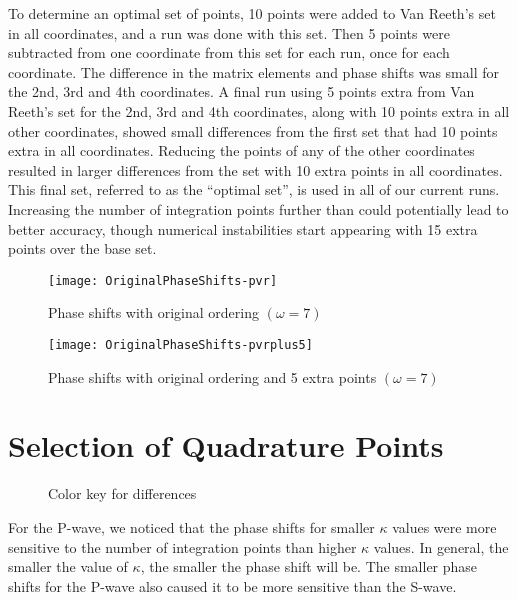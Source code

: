 \documentclass[Dissertation.tex]{subfiles}
\begin{document}
To determine an optimal set of points, 10 points were added to Van Reeth's 
set in all coordinates, and a run was done with this set. Then 5 points were 
subtracted from one coordinate from this set for each run, once for each 
coordinate. The difference in the matrix elements and phase shifts was small 
for the 2nd, 3rd and 4th coordinates. A final run using 5 points extra from 
Van Reeth's set for the 2nd, 3rd and 4th coordinates, along with 10 points 
extra in all other coordinates, showed small differences from the first set 
that had 10 points extra in all coordinates. Reducing the points of any of 
the other coordinates resulted in larger differences from the set with 10 
extra points in all coordinates. This final set, referred to as the ``optimal 
set'', is used in all of our current runs. Increasing the number of 
integration points further than could potentially lead to better accuracy, 
though numerical instabilities start appearing with 15 extra points over the 
base set.


\begin{figure}
	\centering
	\texttt{[image: OriginalPhaseShifts-pvr]}
	\caption{Phase shifts with original ordering $(\omega = 7)$}
	\label{fig:OriginalPhaseShifts-pvr}
\end{figure}

\begin{figure}
	\centering
	\texttt{[image: OriginalPhaseShifts-pvrplus5]}
	\caption{Phase shifts with original ordering and 5 extra points $(\omega = 7)$}
	\label{fig:OriginalPhaseShifts-pvrplus5}
\end{figure}



\section{Selection of Quadrature Points}
\label{sec:SelQuadPoints2}

\begin{figure}
	\caption{Color key for differences}
	\label{fig:ColorKey}
\end{figure}

For the P-wave, we noticed that the phase shifts for smaller $\kappa$ values were more sensitive to the number of integration points than higher $\kappa$ values. In general, the smaller the value of $\kappa$, the smaller the phase shift will be. The smaller phase shifts for the P-wave also caused it to be more sensitive than the S-wave.
\end{document}

